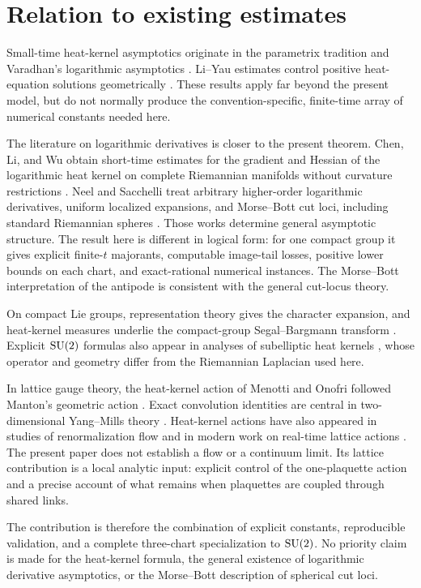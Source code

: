 \section{Relation to existing estimates}\label{sec:related}

Small-time heat-kernel asymptotics originate in the parametrix tradition
\cite{MinakshisundaramPleijel1949} and Varadhan's logarithmic asymptotics
\cite{Varadhan1967}.  Li--Yau estimates control positive heat-equation
solutions geometrically \cite{LiYau1986}.  These results apply far beyond the
present model, but do not normally produce the convention-specific,
finite-time array of numerical constants needed here.

The literature on logarithmic derivatives is closer to the present theorem.
Chen, Li, and Wu obtain short-time estimates for the gradient and Hessian of
the logarithmic heat kernel on complete Riemannian manifolds without curvature
restrictions \cite{ChenLiWu2023}.  Neel and Sacchelli treat arbitrary
higher-order logarithmic derivatives, uniform localized expansions, and
Morse--Bott cut loci, including standard Riemannian spheres
\cite{NeelSacchelli2025}.  Those works determine general asymptotic structure.
The result here is different in logical form: for one compact group it gives
explicit finite-$t$ majorants, computable image-tail losses, positive lower
bounds on each chart, and exact-rational numerical instances.  The
Morse--Bott interpretation of the antipode is consistent with the general
cut-locus theory.

On compact Lie groups, representation theory gives the character expansion,
and heat-kernel measures underlie the compact-group Segal--Bargmann transform
\cite{Hall1994}.  Explicit $\mathrm{SU}(2)$ formulas also appear in analyses of
subelliptic heat kernels \cite{BaudoinBonnefont2008,AgrachevEtAl2009}, whose
operator and geometry differ from the Riemannian Laplacian used here.

In lattice gauge theory, the heat-kernel action of Menotti and Onofri
\cite{MenottiOnofri1981} followed Manton's geometric action \cite{Manton1980}.
Exact convolution identities are central in
two-dimensional Yang--Mills theory
\cite{GrossKingSengupta1989,Sengupta1993}.  Heat-kernel actions have also
appeared in studies of renormalization flow \cite{BitarDukeJadid1985} and in
modern work on real-time lattice actions \cite{KanwarWagman2021}.  The present
paper does not establish a flow or a continuum limit.  Its lattice
contribution is a local analytic input: explicit control of the one-plaquette
action and a precise account of what remains when plaquettes are coupled
through shared links.

The contribution is therefore the combination of explicit constants,
reproducible validation, and a complete three-chart specialization to $\mathrm{SU}(2)$.
No priority claim is made for the heat-kernel
formula, the general existence of logarithmic derivative asymptotics, or the
Morse--Bott description of spherical cut loci.
